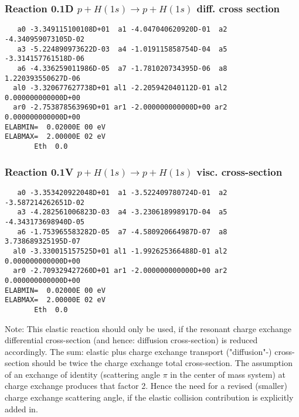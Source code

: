 \documentclass[12pt,dvipdfmx]{article}
\begin{document}
\subsubsection{
Reaction 0.1D    $ p + H(1s) \rightarrow p + H(1s)$  diff. cross
section}


\begin{small}\begin{verbatim}
   a0 -3.349115100108D+01  a1 -4.047040620920D-01  a2 -4.340959073105D-02
   a3 -5.224890973622D-03  a4 -1.019115858754D-04  a5 -3.314157761518D-06
   a6 -4.336259011986D-05  a7 -1.781020734395D-06  a8  1.220393550627D-06
  al0 -3.320677627738D+01 al1 -2.205942040112D-01 al2  0.000000000000D+00
  ar0 -2.753878563969D+01 ar1 -2.000000000000D+00 ar2  0.000000000000D+00
ELABMIN=  0.02000E 00 eV
ELABMAX=  2.00000E 02 eV
       Eth  0.0
\end{verbatim}\end{small}


\subsubsection{
Reaction 0.1V    $p + H(1s) \rightarrow p + H(1s)$ visc. cross-section
}



\begin{small}\begin{verbatim}
   a0 -3.353420922048D+01  a1 -3.522409780724D-01  a2 -3.587214262651D-02
   a3 -4.282561006823D-03  a4 -3.230618998917D-04  a5 -4.343173698940D-05
   a6 -1.753965583282D-05  a7 -4.580920664987D-07  a8  3.738689325195D-07
  al0 -3.330015157525D+01 al1 -1.992625366488D-01 al2  0.000000000000D+00
  ar0 -2.709329427260D+01 ar1 -2.000000000000D+00 ar2  0.000000000000D+00
ELABMIN=  0.02000E 00 eV
ELABMAX=  2.00000E 02 eV
       Eth  0.0
\end{verbatim}\end{small}

Note: This elastic reaction should only be used, if the resonant charge
exchange differential cross-section (and hence: diffusion cross-section)
is reduced accordingly. The sum: elastic plus charge exchange transport
("diffusion"-) cross-section should be twice the charge exchange total
cross-section. The assumption of an exchange of identity (scattering
angle $\pi$ in the center of mass system) at charge exchange produces
that factor 2. Hence the need for a revised (smaller) charge exchange
scattering angle, if the elastic collision contribution is explicitly
added in.
\end{document}
